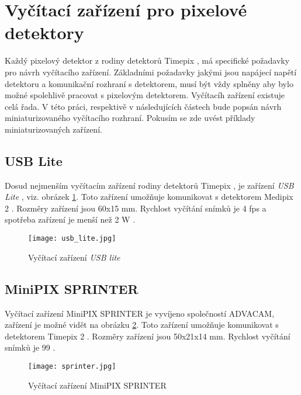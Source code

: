
\section{Vyčítací zařízení pro pixelové detektory}
Každý pixelový detektor z rodiny detektorů Timepix \cite{Llopart}, má specifické požadavky pro návrh vyčítacího zařízení. Základními požadavky jakými jsou napájecí napětí detektoru a komunikační rozhraní s detektorem, musí být vždy splněny aby bylo možné spolehlivě pracovat s pixelovým detektorem. Vyčítacíh zařízení existuje celá řada. V této práci, respektivě v následujících částech bude popsán návrh miniaturizovaného vyčítacího rozhraní. Pokusím se zde uvést příklady miniaturizovaných zařízení.
\subsection{USB Lite}
Dosud nejmenším vyčítacím zařízení rodiny detektorů Timepix \cite{Llopart}, je zařízení \textit{USB Lite} \cite{usb_lite}, viz. obrázek \ref{fig:usb_lite}. Toto zařízení umožňuje komunikovat s detektorem Medipix 2 \cite{Medpix2}. Rozměry zařízení jsou 60x15 mm. Rychlost vyčítání snímků je 4 fps a spotřeba zařízení je menší než 2 W \cite{usb_lite}.
 \begin{figure}[h!]
	\centering
	\captionsetup{justification=centering}
	\texttt{[image: usb\_lite.jpg]}
	\caption{Vyčítací zařízení \textit{USB lite}} 
	\label{fig:usb_lite}
\end{figure}	

\subsection{MiniPIX SPRINTER}
Vyčítací zařízení MiniPIX SPRINTER je vyvíjeno společností ADVACAM, zařízení je možné vidět na obrázku \ref{fig:sprinter}. Toto zařízení umožňuje komunikovat s detektorem Timepix 2 \cite{tpx2_manual}. Rozměry zařízení jsou 50x21x14 mm. Rychlost vyčítání snímků je 99 \cite{Advacam}.
\begin{figure}[h!]
	\centering
	\captionsetup{justification=centering}
	\texttt{[image: sprinter.jpg]}
	\caption{Vyčítací zařízení MiniPIX SPRINTER} 
	\label{fig:sprinter}
\end{figure}	

